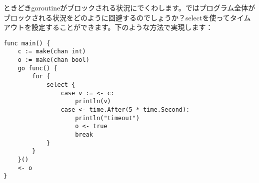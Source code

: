 ときどきgoroutineがブロックされる状況にでくわします。ではプログラム全体がブロックされる状況をどのように回避するのでしょうか？selectを使ってタイムアウトを設定することができます。下のような方法で実現します：

\begin{lstlisting}[numbers=none]
func main() {
    c := make(chan int)
    o := make(chan bool)
    go func() {
        for {
            select {
                case v := <- c:
                    println(v)
                case <- time.After(5 * time.Second):
                    println("timeout")
                    o <- true
                    break
            }
        }
    }()
    <- o
}
\end{lstlisting}
